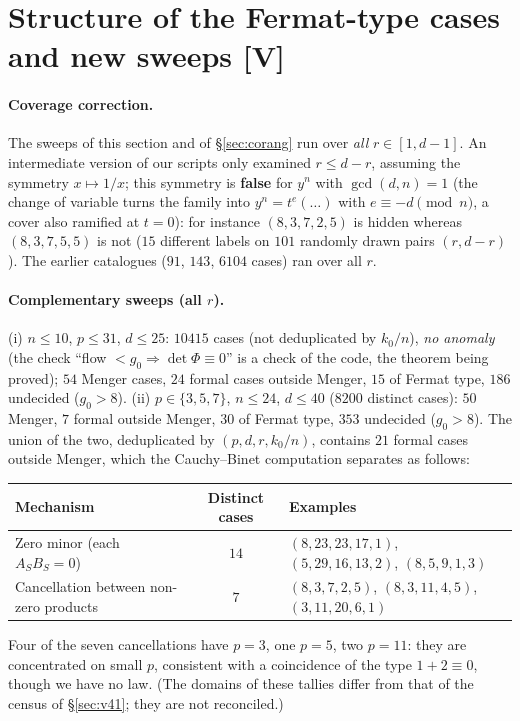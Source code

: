 \documentclass[11pt,a4paper]{article}
\begin{document}
\section{Structure of the Fermat-type cases and new sweeps \textbf{[V]}}
\label{sec:fermat}

\paragraph{Coverage correction.} The sweeps of this section and of
\S\ref{sec:corang} run over \emph{all} $r\in[1,d-1]$. An intermediate version of
our scripts only examined $r\le d-r$, assuming the symmetry $x\mapsto1/x$; this
symmetry is \textbf{false} for $y^n$ with $\gcd(d,n)=1$ (the change of variable
turns the family into $y^n=t^{e}(\dots)$ with $e\equiv-d\pmod n$, a cover also
ramified at $t=0$): for instance $(8,3,7,2,5)$ is hidden whereas $(8,3,7,5,5)$ is
not ($15$ different labels on $101$ randomly drawn pairs $(r,d-r)$). The earlier
catalogues ($91$, $143$, $6104$ cases) ran over all $r$.

\paragraph{Complementary sweeps (all $r$).} (i) $n\le10$, $p\le31$, $d\le25$:
$10415$ cases (not deduplicated by $k_0/n$), \emph{no anomaly} (the check
``flow $<g_0\Rightarrow\det\Phi\equiv0$'' is a check of the code, the theorem
being proved); $54$ Menger cases, $24$ formal cases outside Menger, $15$ of
Fermat type, $186$ undecided ($g_0>8$). (ii) $p\in\{3,5,7\}$, $n\le24$, $d\le40$
($8200$ distinct cases): $50$ Menger, $7$ formal outside Menger, $30$ of Fermat
type, $353$ undecided ($g_0>8$). The union of the two, deduplicated by
$(p,d,r,k_0/n)$, contains $21$ formal cases outside Menger, which the
Cauchy--Binet computation separates as follows:
\begin{center}
\begin{tabular}{lcl}
Mechanism & Distinct cases & Examples\\\hline
Zero minor (each $A_SB_S=0$) & $14$ & $(8,23,23,17,1)$, $(5,29,16,13,2)$, $(8,5,9,1,3)$\\
Cancellation between non-zero products & $7$ & $(8,3,7,2,5)$, $(8,3,11,4,5)$, $(3,11,20,6,1)$\\\hline
\end{tabular}
\end{center}
Four of the seven cancellations have $p=3$, one $p=5$, two $p=11$: they are
concentrated on small $p$, consistent with a coincidence of the type
$1+2\equiv0$, though we have no law. (The domains of these tallies differ from
that of the census of \S\ref{sec:v41}; they are not reconciled.)
\end{document}
